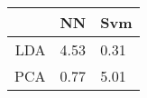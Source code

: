 \begin{tabular}{|r|l|l|}
  \hline
    & NN & Svm \\
  \hline
  LDA & 4.53 & 0.31 \\
  \hline
  PCA & 0.77 & 5.01 \\
  \hline
\end{tabular}
